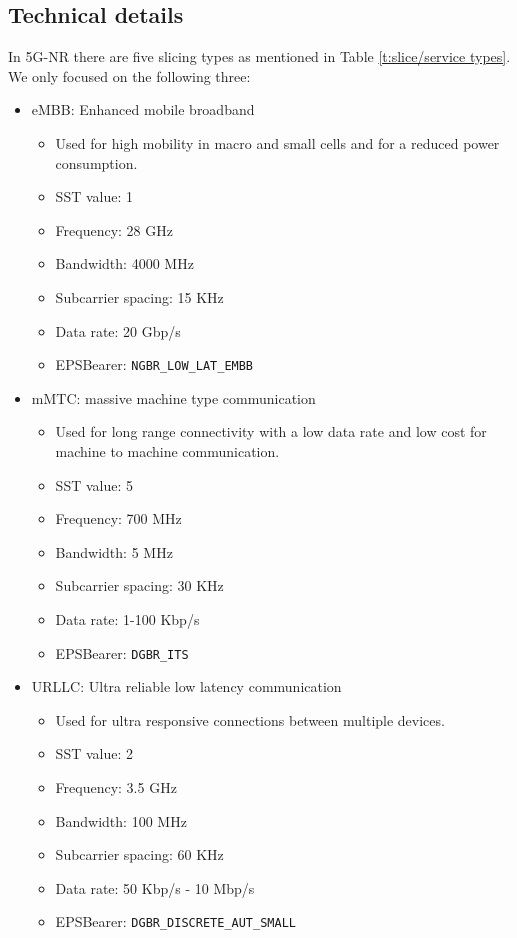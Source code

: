     \subsection{Technical details}
    In 5G-NR there are five slicing types as mentioned in Table \ref{t:slice/service types}. We only focused on the following three:
    \begin{itemize}
        \item eMBB: Enhanced mobile broadband
        \begin{itemize}
            \item Used for high mobility in macro and small cells and for a reduced power consumption.
            \item SST value: 1
            \item Frequency: 28 GHz
            \item Bandwidth: 4000 MHz
            \item Subcarrier spacing: 15 KHz
            \item Data rate: 20 Gbp/s
            \item EPSBearer: \verb!NGBR_LOW_LAT_EMBB!
        \end{itemize}
        \item mMTC: massive machine type communication
        \begin{itemize}
            \item Used for long range connectivity with a low data rate and low cost for machine to machine communication.
            \item SST value: 5
            \item Frequency: 700 MHz
            \item Bandwidth: 5 MHz
            \item Subcarrier spacing: 30 KHz
            \item Data rate: 1-100 Kbp/s
            \item EPSBearer: \verb!DGBR_ITS! 
        \end{itemize}
        \item URLLC: Ultra reliable low latency communication
        \begin{itemize}
            \item Used for ultra responsive connections between multiple devices.
            \item SST value: 2
            \item Frequency: 3.5 GHz
            \item Bandwidth: 100 MHz
            \item Subcarrier spacing: 60 KHz
            \item Data rate: 50 Kbp/s - 10 Mbp/s
            \item EPSBearer: \verb!DGBR_DISCRETE_AUT_SMALL!
        \end{itemize}
    \end{itemize}
    
